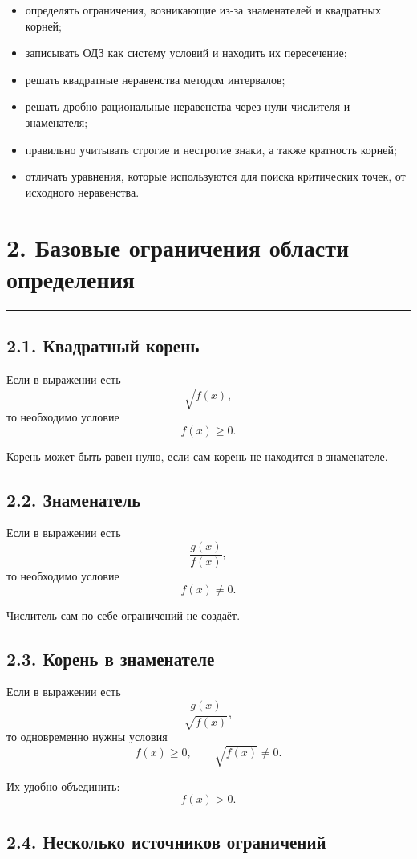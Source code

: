 \documentclass[a4paper,12pt]{article}
\newcommand{\topicsection}[1]{%
    \section*{\textcolor{darkaccent}{#1}}%
    \vspace{-0.4em}%
    \textcolor{accent}{\rule{\linewidth}{0.7pt}}%
    \vspace{0.4em}%
}
\begin{document}
\begin{itemize}
    \item определять ограничения, возникающие из-за знаменателей и квадратных корней;
    \item записывать ОДЗ как систему условий и находить их пересечение;
    \item решать квадратные неравенства методом интервалов;
    \item решать дробно-рациональные неравенства через нули числителя и знаменателя;
    \item правильно учитывать строгие и нестрогие знаки, а также кратность корней;
    \item отличать уравнения, которые используются для поиска критических точек, от исходного неравенства.
\end{itemize}

\topicsection{2. Базовые ограничения области определения}

\subsection*{2.1. Квадратный корень}

Если в выражении есть
\[
\sqrt{f(x)},
\]
то необходимо условие
\[
f(x)\ge 0.
\]

Корень может быть равен нулю, если сам корень не находится в знаменателе.

\subsection*{2.2. Знаменатель}

Если в выражении есть
\[
\frac{g(x)}{f(x)},
\]
то необходимо условие
\[
f(x)\ne 0.
\]

Числитель сам по себе ограничений не создаёт.

\subsection*{2.3. Корень в знаменателе}

Если в выражении есть
\[
\frac{g(x)}{\sqrt{f(x)}},
\]
то одновременно нужны условия
\[
f(x)\ge 0,
\qquad
\sqrt{f(x)}\ne 0.
\]

Их удобно объединить:
\[
\boxed{f(x)>0}.
\]

\subsection*{2.4. Несколько источников ограничений}
\end{document}
